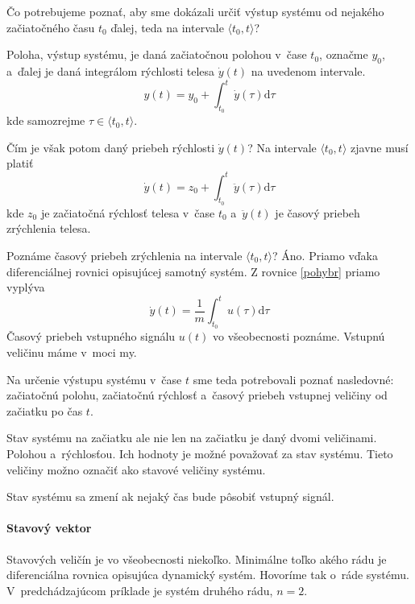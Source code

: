 \documentclass[a4paper, 10pt, ]{article}
\begin{document}
Čo potrebujeme poznať, aby sme dokázali určiť výstup systému od nejakého začiatočného času $t_0$ ďalej, teda na intervale $\langle t_0, t \rangle$?

Poloha, výstup systému, je daná začiatočnou polohou v~čase $t_0$, označme $y_0$, a~ďalej je daná integrálom rýchlosti telesa $\dot y(t)$ na uvedenom intervale.
\begin{equation}
    y(t) = y_0 + \int_{t_0}^{t}\dot y(\tau) \text{d}\tau
\end{equation}
kde samozrejme $\tau \in \langle t_0, t \rangle$.

Čím je však potom daný priebeh rýchlosti $\dot y(t)$? Na intervale $\langle t_0, t \rangle$ zjavne musí platiť
\begin{equation}
    \dot y(t) = z_0 + \int_{t_0}^{t}\ddot y(\tau) \text{d}\tau
\end{equation}
kde $z_0$ je začiatočná rýchlosť telesa v~čase $t_0$ a~$\ddot y(t)$ je časový priebeh zrýchlenia telesa. 

Poznáme časový priebeh zrýchlenia na intervale $\langle t_0, t \rangle$? Áno. Priamo vďaka diferenciálnej rovnici opisujúcej samotný systém. Z rovnice \eqref{pohybr} priamo vyplýva
\begin{equation}
    \dot y(t) = \frac{1}{m} \int_{t_0}^{t}  u(\tau) \text{d}\tau
\end{equation}
Časový priebeh vstupného signálu $u(t)$ vo všeobecnosti poznáme. Vstupnú veličinu máme v~moci my.

Na určenie výstupu systému v~čase $t$ sme teda potrebovali poznať nasledovné: začiatočnú polohu, začiatočnú rýchlosť a~časový priebeh vstupnej veličiny od začiatku po čas $t$.

Stav systému na začiatku ale nie len na začiatku je daný dvomi veličinami. Polohou a~rýchlosťou. Ich hodnoty je možné považovať za stav systému. Tieto veličiny možno označiť ako stavové veličiny systému.

Stav systému sa zmení ak nejaký čas bude pôsobiť vstupný signál.


\paragraph{Stavový vektor}

Stavových veličín je vo všeobecnosti niekoľko. Minimálne toľko akého rádu je diferenciálna rovnica opisujúca dynamický systém. Hovoríme tak o~ráde systému. V~predchádzajúcom príklade je systém  druhého rádu, $n=2$.
\end{document}
